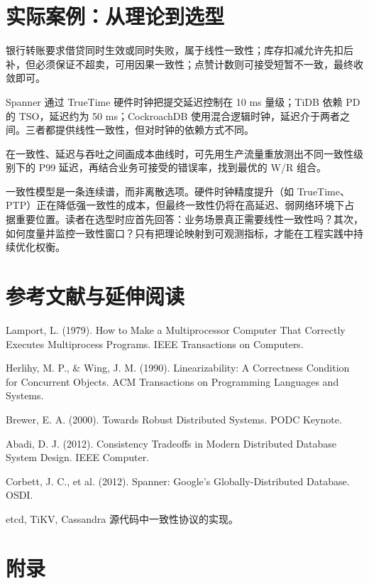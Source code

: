 \chapter{实际案例：从理论到选型}
银行转账要求借贷同时生效或同时失败，属于线性一致性；库存扣减允许先扣后补，但必须保证不超卖，可用因果一致性；点赞计数则可接受短暂不一致，最终收敛即可。\par
Spanner 通过 TrueTime 硬件时钟把提交延迟控制在 10 ms 量级；TiDB 依赖 PD 的 TSO，延迟约为 50 ms；CockroachDB 使用混合逻辑时钟，延迟介于两者之间。三者都提供线性一致性，但对时钟的依赖方式不同。\par
在一致性、延迟与吞吐之间画成本曲线时，可先用生产流量重放测出不同一致性级别下的 P99 延迟，再结合业务可接受的错误率，找到最优的 W/R 组合。\par
一致性模型是一条连续谱，而非离散选项。硬件时钟精度提升（如 TrueTime、PTP）正在降低强一致性的成本，但最终一致性仍将在高延迟、弱网络环境下占据重要位置。读者在选型时应首先回答：业务场景真正需要线性一致性吗？其次，如何度量并监控一致性窗口？只有把理论映射到可观测指标，才能在工程实践中持续优化权衡。\par
\chapter{参考文献与延伸阅读}
Lamport, L. (1979). How to Make a Multiprocessor Computer That Correctly Executes Multiprocess Programs. IEEE Transactions on Computers.\par
Herlihy, M. P., \&{} Wing, J. M. (1990). Linearizability: A Correctness Condition for Concurrent Objects. ACM Transactions on Programming Languages and Systems.\par
Brewer, E. A. (2000). Towards Robust Distributed Systems. PODC Keynote.\par
Abadi, D. J. (2012). Consistency Tradeoffs in Modern Distributed Database System Design. IEEE Computer.\par
Corbett, J. C., et al. (2012). Spanner: Google’s Globally-Distributed Database. OSDI.\par
etcd, TiKV, Cassandra 源代码中一致性协议的实现。\par
\chapter{附录}
